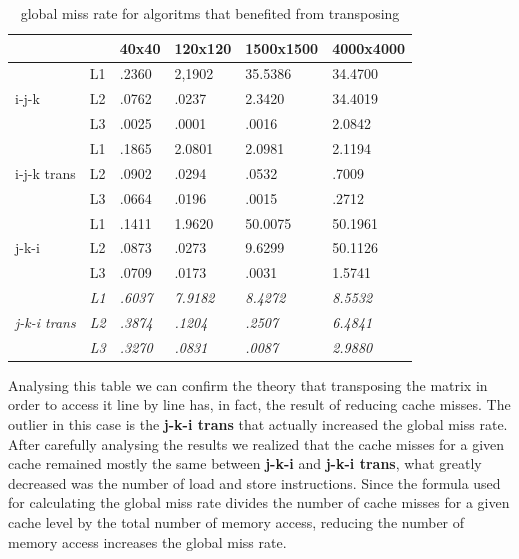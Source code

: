 \documentclass[a4paper]{report}
\begin{document}
\begin{table}[H]
\centering
\begin{tabular}{|l|l|l|l|l|l|}
\hline
\multicolumn{2}{|l|}{}            & 40x40 & 120x120 & 1500x1500 & 4000x4000 \\ \hline
\multirow{3}{*}{i-j-k}       & L1 & .2360 & 2,1902  & 35.5386   & 34.4700   \\ \cline{2-6}
                             & L2 & .0762 & .0237   & 2.3420    & 34.4019   \\ \cline{2-6}
                             & L3 & .0025 & .0001   & .0016     & 2.0842    \\ \hline
\multirow{3}{*}{i-j-k trans} & L1 & .1865 & 2.0801  & 2.0981    & 2.1194    \\ \cline{2-6}
                             & L2 & .0902 & .0294   & .0532     & .7009     \\ \cline{2-6}
                             & L3 & .0664 & .0196   & .0015     & .2712     \\ \hline
\multirow{3}{*}{j-k-i}       & L1 & .1411 & 1.9620  & 50.0075   & 50.1961   \\ \cline{2-6}
                             & L2 & .0873 & .0273   & 9.6299    & 50.1126   \\ \cline{2-6}
                             & L3 & .0709 & .0173   & .0031     & 1.5741    \\ \hline
\multirow{3}{*}{\textit{j-k-i trans}} & \textit{L1} & \textit{.6037} & \textit{7.9182}  & \textit{8.4272}    & \textit{8.5532}    \\ \cline{2-6}
                                      & \textit{L2} & \textit{.3874} & \textit{.1204}   & \textit{.2507}     & \textit{6.4841}    \\ \cline{2-6}
                                      & \textit{L3} & \textit{.3270} & \textit{.0831}   & \textit{.0087}     & \textit{2.9880}    \\ \hline
\end{tabular}
\caption{global miss rate for algoritms that benefited from transposing}
\end{table}

Analysing this table we can confirm the theory that transposing the matrix
in order to access it line by line has, in fact, the result of reducing cache
misses. The outlier in this case is the \textbf{j-k-i trans} that actually
increased the global miss rate. After carefully analysing the results we
realized that the cache misses for a given cache remained mostly the same
between \textbf{j-k-i} and \textbf{j-k-i trans}, what greatly decreased was the
number of load and store instructions. Since the formula used for calculating
the global miss rate divides the number of cache misses for a given cache level
by the total number of memory access, reducing the number of memory access
increases the global miss rate.
\end{document}
